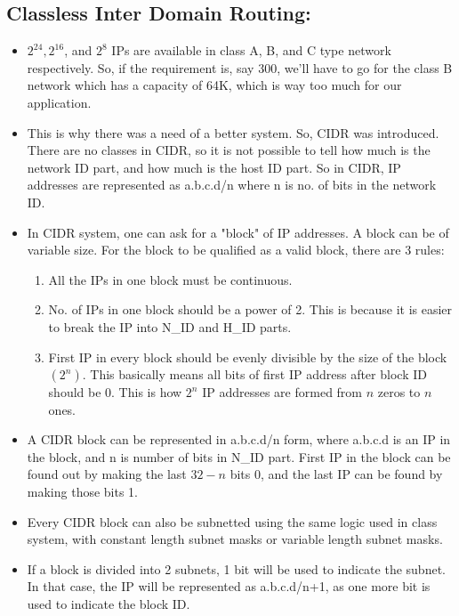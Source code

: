 \documentclass{article}
\begin{document}
	\subsection{Classless Inter Domain Routing:}
	\begin{itemize}
		\item $2^{24}, 2^{16}$, and $2^{8}$ IPs are available in class A, B, and C type network respectively. So, if the requirement is, say 300, we'll have to go for the class B network which has a capacity of 64K, which is way too much for our application.
		\item This is why there was a need of a better system. So, CIDR was introduced. There are no classes in CIDR, so it is not possible to tell how much is the network ID part, and how much is the host ID part. So in CIDR, IP addresses are represented as a.b.c.d/n where n is no. of bits in the network ID.
		\item In CIDR system, one can ask for a "block" of IP addresses. A block can be of variable size. For the block to be qualified as a valid block, there are 3 rules: \begin{enumerate}
			\item All the IPs in one block must be continuous.
			\item No. of IPs in one block should be a power of 2. This is because it is easier to break the IP into N\_ID and H\_ID parts.
			\item First IP in every block should be evenly divisible by the size of the block $(2^n)$. This basically means all bits of first IP address after block ID should be 0. This is how $2^n$ IP addresses are formed from $n$ zeros to $n$ ones.
		\end{enumerate}
		\item A CIDR block can be represented in a.b.c.d/n form, where a.b.c.d is an IP in the block, and n is number of bits in N\_ID part. First IP in the block can be found out by making the last $32-n$ bits 0, and the last IP can be found by making those bits 1.
		\item Every CIDR block can also be subnetted using the same logic used in class system, with constant length subnet masks or variable length subnet masks.
		\item If a block is divided into 2 subnets, 1 bit will be used to indicate the subnet. In that case, the IP will be represented as a.b.c.d/n+1, as one more bit is used to indicate the block ID.
	\end{itemize}
\end{document}
